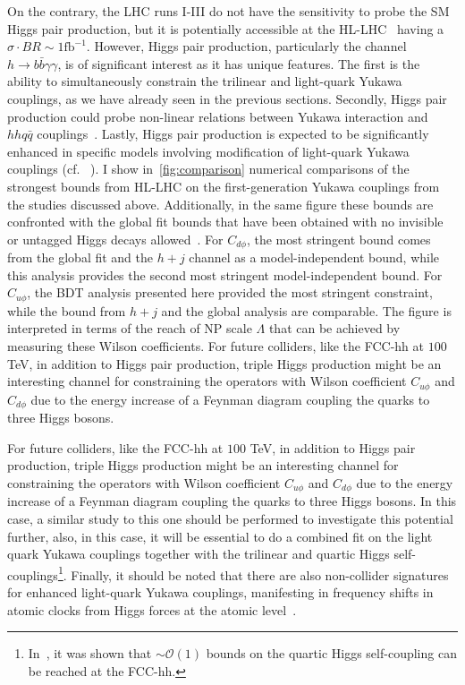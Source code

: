 \par On the contrary, the LHC runs I-III do not have the sensitivity to probe the SM Higgs pair production, but it is potentially accessible at the HL-LHC~\cite{Binoth:2006ym} having a $ \sigma \cdot BR\sim 1\mathrm{fb}^{-1}$. However, Higgs pair production, particularly the channel~$h \to b \bar b \gamma \gamma $, is of significant interest as it has unique features. The first is the ability to simultaneously constrain the trilinear and light-quark Yukawa couplings, as we have already seen in the previous sections. Secondly, Higgs pair production could probe non-linear relations between Yukawa interaction and~$hh q\bar q$ couplings~\cite{Contino:2012xk}. Lastly, Higgs pair production is expected to be significantly enhanced in specific models involving modification of light-quark Yukawa couplings (cf. ~\cite{Bar-Shalom:2018rjs,Bauer:2017cov,Egana-Ugrinovic:2021uew}).
I show in~\autoref{fig:comparison} numerical comparisons of the strongest bounds from HL-LHC on the first-generation Yukawa couplings from the studies discussed above. Additionally, in the same figure these bounds are confronted with the global fit bounds that have been obtained with no invisible or untagged Higgs decays allowed~\cite{deBlas:2019rxi}. For $C_{d\phi}$, the most stringent bound comes from the global fit and the $h+j$ channel as a model-independent bound, while this analysis provides the second most stringent model-independent bound. For $C_{u\phi}$, the BDT analysis presented here provided the most stringent constraint, while the bound from $h+j$ and the global analysis are comparable. The figure is interpreted in terms of the reach of NP scale $\Lambda$ that can be achieved by measuring these Wilson coefficients. For future colliders, like the FCC-hh at $100$ TeV, in addition to Higgs pair production, triple Higgs production might be an interesting channel for constraining the operators with Wilson coefficient $C_{u\phi}$ and $C_{d\phi}$ due to the energy increase of a Feynman diagram coupling the quarks to three Higgs bosons.

\par For future colliders, like the FCC-hh at $100$ TeV, in addition to Higgs pair production, triple Higgs production might be an interesting channel for constraining the operators with Wilson coefficient $C_{u\phi}$ and $C_{d\phi}$ due to the energy increase of a Feynman diagram coupling the quarks to three Higgs bosons.   In this case, a similar study to this one should be performed to investigate this potential further, also, in this case, it will be essential to do a combined fit on the light quark Yukawa couplings together with the trilinear and quartic Higgs self-couplings\footnote{In~\cite{Papaefstathiou:2047255}, it was shown that $\sim \mathcal{O}(1)$ bounds on the quartic Higgs self-coupling can be reached at the FCC-hh.}.
Finally, it should be noted that there are also non-collider signatures for enhanced light-quark Yukawa couplings, manifesting in frequency shifts in atomic clocks from Higgs forces at the atomic level~\cite{Delaunay:2016brc}. 
